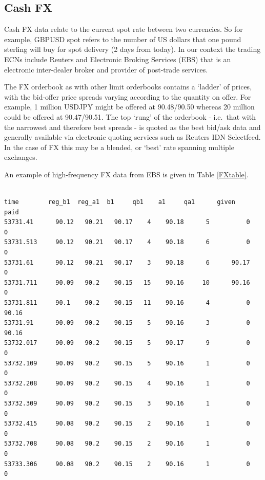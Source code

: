 {\subsection{Cash FX}  
Cash FX data relate to the current spot rate between two currencies.  So for example, GBPUSD spot refers to the number of US dollars that one pound sterling will buy for spot delivery (2 days from today). In our context the trading ECNs include Reuters and Electronic Broking Services (EBS) that is an electronic inter-dealer broker and provider of post-trade services. 

The FX orderbook as with other limit orderbooks contains a `ladder' of prices, with the bid-offer price spreads varying according to the quantity on offer.  For example, 1 million USDJPY might be offered at 90.48/90.50 whereas 20 million could be offered at 90.47/90.51. The top `rung' of the orderbook - i.e.\ that with the narrowest and therefore best spreads - is quoted as the best bid/ask data and generally available via electronic quoting services such as Reuters IDN Selectfeed.  In the case of FX this may be a blended, or `best' rate spanning multiple exchanges.  

An example of high-frequency FX data from EBS is given in Table \ref{FXtable}.

\begin{table}
\begin{center}
\begin{minipage}{0.9\linewidth}
{\scriptsize \begin{verbatim}

time        reg_b1  reg_a1  b1     qb1    a1     qa1      given     paid
53731.41 	  90.12	  90.21   90.17	   4    90.18	   5          0        0
53731.513	  90.12	  90.21   90.17	   4    90.18	   6          0        0
53731.61 	  90.12	  90.21   90.17	   3    90.18	   6      90.17        0
53731.711	  90.09	  90.2 	  90.15   15    90.16	  10      90.16        0
53731.811	  90.1 	  90.2 	  90.15	  11    90.16	   4          0    90.16
53731.91 	  90.09	  90.2 	  90.15	   5    90.16	   3          0    90.16
53732.017	  90.09	  90.2 	  90.15	   5    90.17	   9          0        0
53732.109	  90.09	  90.2 	  90.15	   5    90.16	   1          0        0
53732.208	  90.09	  90.2 	  90.15	   4    90.16	   1          0        0
53732.309	  90.09	  90.2 	  90.15	   3    90.16	   1          0        0
53732.415	  90.08	  90.2 	  90.15	   2    90.16	   1          0        0
53732.708	  90.08	  90.2 	  90.15	   2    90.16	   1          0        0
53733.306	  90.08	  90.2 	  90.15	   2    90.16	   1          0        0



\end{verbatim}}
\end{minipage}
\end{center}
\end{table}}
